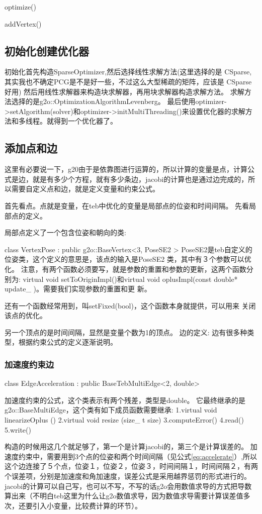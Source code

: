 \documentclass[10pt,a4paper]{article}
\theoremstyle{mythm}
\numberwithin{equation}{section}
\begin{document}
optimize()

addVertex()

\subsection{初始化创建优化器}

初始化首先构造SparseOptimizer,然后选择线性求解方法(这里选择的是
CSparse,其实我也不确定PCG是不是好一些，不过这么大型稀疏的矩阵，应该是
CSparse好用)
然后用线性求解器来构造块求解器，再用块求解器构造求解方法。
求解方法选择的是g2o::OptimizationAlgorithmLevenberg。
最后使用optimizer->setAlgorithm(solver)和optimizer->initMultiThreading()来设置优化器的求解方法和多线程。就得到一个优化器了。

\subsection{添加点和边}
这里有必要说一下，g20由于是依靠图进行运算的，所以计算的变量是点，计算公式是边，就是有多少个方程，就有多少条边，jacobi的计算也是通过边完成的，所以需要自定义点和边，就是定义变量和约束公式。

首先看点。点就是变量，在teb中优化的变量是局部点的位姿和时间间隔。
先看局部点的定义。

局部点定义了一个包含位姿和朝向的类:

class VertexPose : public g2o::BaseVertex<3, PoseSE2 >
PoseSE2是teb自定义的位姿类，这个定义的意思是，该点的输入是PoseSE2
类，其中有３个参数可以优化。
注意，有两个函数必须要写，就是参数的重置和参数的更新，这两个函数分别为:
virtual void setToOriginImpl()和virtual void 
oplusImpl(const double* update\_ )。需要我们实现参数的重置和更
新。

还有一个函数经常用到，叫setFixed(bool)，这个函数本身就提供，可以用来
关闭该点的优化。

另一个顶点的是时间间隔，显然是变量个数为1的顶点。
边的定义:
边有很多种类型，根据约束公式的定义逐渐说明。
\subsubsection{加速度约束边}
class EdgeAcceleration : public BaseTebMultiEdge<2, double>

加速度约束的公式，这个类表示有两个残差，类型是double。
它最终继承的是g2o::BaseMultiEdge，这个类有如下成员函数需要继承:
1.virtual void 	linearizeOplus ()
2.virtual void 	resize (size\_ t size)
3.computeError()
4.read()
5.write()

构造的时候用这几个就足够了，第一个是计算jacobi的，第三个是计算误差的。
加速度约束中，需要用到3个点的位姿和两个时间间隔（见公式\ref{eq:accelerate}）,所以这个边连接了５个点，位姿１，位姿２，位姿３，时间间隔１，时间间隔２，有两个误差项，分别是加速度和角加速度，误差公式是采用越界惩罚的形式进行的。jacobi的计算可以自己写，也可以不写，不写的话g2o会用数值求导的方式把导数算出来（不明白teb这里为什么让g2o数值求导，因为数值求导需要计算误差值多次，还要引入小变量，比较费计算的环节）。
\end{document}
